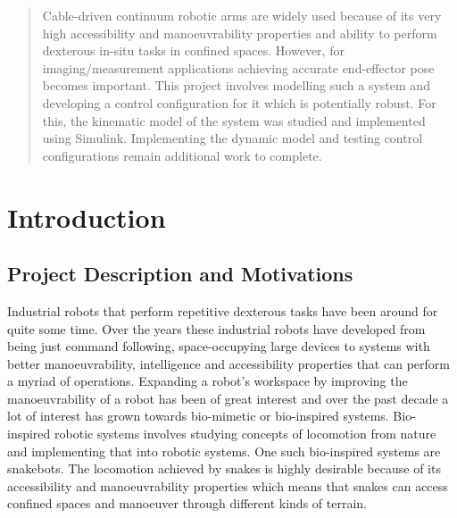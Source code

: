 \documentclass[a4paper,12pt]{report}
\begin{document}
\pagebreak



\tableofcontents

\pagebreak

\begin{abstract}
    Cable-driven continuum robotic arms are widely used because of its very high accessibility and manoeuvrability properties and ability to perform dexterous in-situ tasks in confined spaces. However, for imaging/measurement applications achieving accurate end-effector pose becomes important. This project involves modelling such a system and developing a control configuration for it which is potentially robust. For this, the kinematic model of the system was studied and implemented using Simulink. Implementing the dynamic model and testing control configurations remain additional work to complete.
    
\end{abstract}

\chapter{Introduction}
\section{Project Description and Motivations}
Industrial robots that perform repetitive dexterous tasks have been around for quite some time. Over the years these industrial robots have developed from being just command following, space-occupying large devices to systems with better manoeuvrability, intelligence and accessibility properties that can perform a myriad of operations. Expanding a robot's workspace by improving the manoeuvrability of a robot has been of great interest and over the past decade a lot of interest has grown towards bio-mimetic or bio-inspired systems. Bio-inspired robotic systems involves studying concepts of locomotion from nature and implementing that into robotic systems. One such bio-inspired systems are snakebots. The locomotion achieved by snakes is highly desirable because of its accessibility and manoeuvrability properties which means that snakes can access confined spaces and manoeuver through different kinds of terrain.
\end{document}
